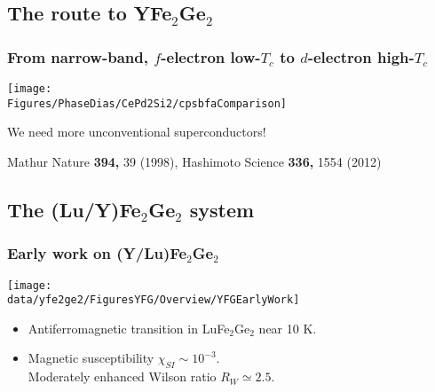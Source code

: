 \subsection{The route to YFe$_2$Ge$_2$}
\begin{frame}[label=YFGIntro1]
\frametitle{From narrow-band, $f$-electron low-$T_c$ to $d$-electron high-$T_c$}
\centerline{\texttt{[image: \\Figures/PhaseDias/CePd2Si2/cpsbfaComparison]}}

\vspace{1em}
\centerline{We need more unconventional superconductors!}

\vspace*{\fill}
\centerline{\makebox[\linewidth]{\rule{0.85\textwidth}{0.4pt}}}
\centerline{\scriptsize Mathur Nature {\bf 394,} 39 (1998), Hashimoto
  Science {\bf 336,} 1554 (2012)}
\end{frame}



\subsection{The (Lu/Y)Fe$_2$Ge$_2$ system}
\begin{frame}[label=EarlyWork]
\frametitle{Early work on (Y/Lu)Fe$_2$Ge$_2$}
\centerline{\texttt{[image: \\data/yfe2ge2/FiguresYFG/Overview/YFGEarlyWork]}}
\begin{itemize} %
\item
Antiferromagnetic transition in LuFe$_2$Ge$_2$ near 10 K.



\item
Magnetic susceptibility $\chi_{SI} \sim 10^{-3}$. \\ Moderately enhanced Wilson ratio $R_W \simeq 2.5$.


\end{itemize}
\end{frame}

